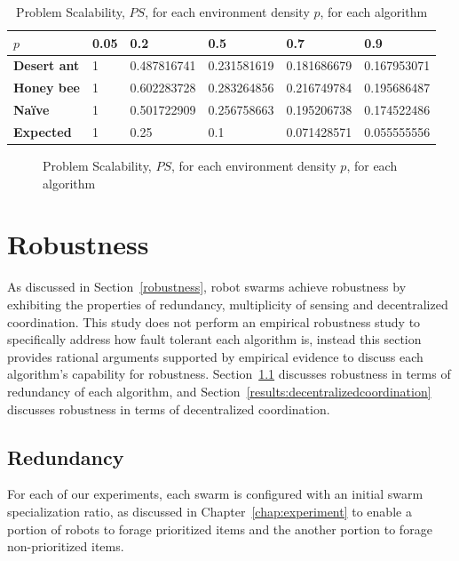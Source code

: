 \begin{table}[]
\centering
\caption{Problem Scalability, $PS$, for each environment density $p$, for each algorithm}
\label{table:problemscalability}
\begin{tabular}{@{}llllll@{}}
\toprule
\textbf{$p$}                  & \textbf{0.05} & \textbf{0.2        } & \textbf{0.5}         & \textbf{0.7}         & \textbf{0.9}         \\ \midrule
\textbf{Desert ant}           & 1    & 0.487816741 & 0.231581619 & 0.181686679 & 0.167953071 \\
\textbf{Honey bee}            & 1    & 0.602283728 & 0.283264856 & 0.216749784 & 0.195686487 \\
\textbf{Na\"ive}              & 1    & 0.501722909 & 0.256758663 & 0.195206738 & 0.174522486 \\
\textbf{Expected} & 1    & 0.25        & 0.1         & 0.071428571 & 0.055555556 \\ \bottomrule
\end{tabular}
\end{table}

\begin{figure}[!htb]
\centering
\resizebox{\textwidth}{!}{}
\caption{Problem Scalability, $PS$, for each environment density $p$, for each algorithm}
\label{fig:problemscalability}
\end{figure}

\section{Robustness}
\label{results:robustness}
As discussed in Section~\ref{robustness}, robot swarms achieve robustness by exhibiting the properties of redundancy, multiplicity of sensing and decentralized coordination. This study does not perform an empirical robustness study to specifically address how fault tolerant each algorithm is, instead this section provides rational arguments supported by empirical evidence to discuss each  algorithm's capability for robustness. Section~\ref{results:redundancy} discusses robustness in terms of redundancy of each algorithm, and Section~\ref{results:decentralizedcoordination} discusses robustness in terms of decentralized coordination.

\subsection{Redundancy}
\label{results:redundancy}
For each of our experiments, each swarm is configured with an initial swarm specialization ratio, as discussed in Chapter~\ref{chap:experiment} to enable a portion of robots to forage prioritized items and the another portion to forage non-prioritized items. 

